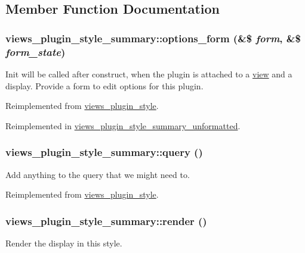 \subsection{Member Function Documentation}
\hypertarget{classviews__plugin__style__summary_a43826183b4d54242ae5276f40f70475f}{
\subsubsection[{options\_\-form}]{\setlength{\rightskip}{0pt plus 5cm}views\_\-plugin\_\-style\_\-summary::options\_\-form (\&\$ {\em form}, \/  \&\$ {\em form\_\-state})}}
\label{classviews__plugin__style__summary_a43826183b4d54242ae5276f40f70475f}
Init will be called after construct, when the plugin is attached to a \hyperlink{classview}{view} and a display. Provide a form to edit options for this plugin. 

Reimplemented from \hyperlink{classviews__plugin__style_afe3d437ff4398315b15c4e60975dbb1c}{views\_\-plugin\_\-style}.

Reimplemented in \hyperlink{classviews__plugin__style__summary__unformatted_a8770285dac047bf88a2c77b2e798826d}{views\_\-plugin\_\-style\_\-summary\_\-unformatted}.\hypertarget{classviews__plugin__style__summary_afd8f02a61bd0e1887cc7767950e8e0df}{
\subsubsection[{query}]{\setlength{\rightskip}{0pt plus 5cm}views\_\-plugin\_\-style\_\-summary::query ()}}
\label{classviews__plugin__style__summary_afd8f02a61bd0e1887cc7767950e8e0df}
Add anything to the query that we might need to. 

Reimplemented from \hyperlink{classviews__plugin__style_af6b601d8f42cc3d86721fcad76eaae4b}{views\_\-plugin\_\-style}.\hypertarget{classviews__plugin__style__summary_a240be31b796b50331a25cf30818e584f}{
\subsubsection[{render}]{\setlength{\rightskip}{0pt plus 5cm}views\_\-plugin\_\-style\_\-summary::render ()}}
\label{classviews__plugin__style__summary_a240be31b796b50331a25cf30818e584f}
Render the display in this style. 

